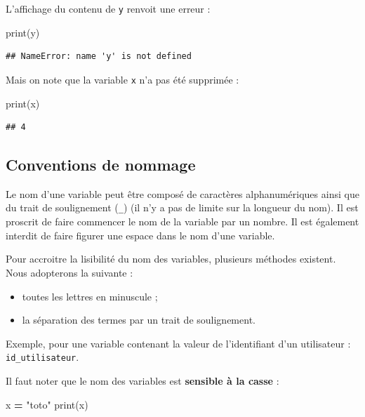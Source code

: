 \documentclass[
  12pt,
]{book}
\newenvironment{Shaded}{\begin{snugshade}}{\end{snugshade}}
\newcommand{\BuiltInTok}[1]{#1}
\newcommand{\NormalTok}[1]{#1}
\newcommand{\OperatorTok}[1]{\textcolor[rgb]{0.81,0.36,0.00}{\textbf{#1}}}
\newcommand{\StringTok}[1]{\textcolor[rgb]{0.31,0.60,0.02}{#1}}
\providecommand{\tightlist}{%
  \setlength{\itemsep}{0pt}\setlength{\parskip}{0pt}}
\numberwithin{equation}{section}
\numberwithin{countremarque}{section}
\begin{document}
L'affichage du contenu de \texttt{y} renvoit une erreur :

\begin{Shaded}
\begin{Highlighting}[]
\BuiltInTok{print}\NormalTok{(y)}
\end{Highlighting}
\end{Shaded}

\begin{lstlisting}
## NameError: name 'y' is not defined
\end{lstlisting}

Mais on note que la variable \texttt{x} n'a pas été supprimée :

\begin{Shaded}
\begin{Highlighting}[]
\BuiltInTok{print}\NormalTok{(x)}
\end{Highlighting}
\end{Shaded}

\begin{lstlisting}
## 4
\end{lstlisting}

\subsection{Conventions de nommage}\label{conventions-de-nommage}

Le nom d'une variable peut être composé de caractères alphanumériques ainsi que du trait de soulignement (\texttt{\_}) (il n'y a pas de limite sur la longueur du nom). Il est proscrit de faire commencer le nom de la variable par un nombre. Il est également interdit de faire figurer une espace dans le nom d'une variable.

Pour accroitre la lisibilité du nom des variables, plusieurs méthodes existent. Nous adopterons la suivante :

\begin{itemize}
\tightlist
\item
  toutes les lettres en minuscule ;
\item
  la séparation des termes par un trait de soulignement.
\end{itemize}

Exemple, pour une variable contenant la valeur de l'identifiant d'un utilisateur : \texttt{id\_utilisateur}.

Il faut noter que le nom des variables est \textbf{sensible à la casse} :

\begin{Shaded}
\begin{Highlighting}[]
\NormalTok{x }\OperatorTok{=} \StringTok{"toto"}
\BuiltInTok{print}\NormalTok{(x)}
\end{Highlighting}
\end{Shaded}
\end{document}
